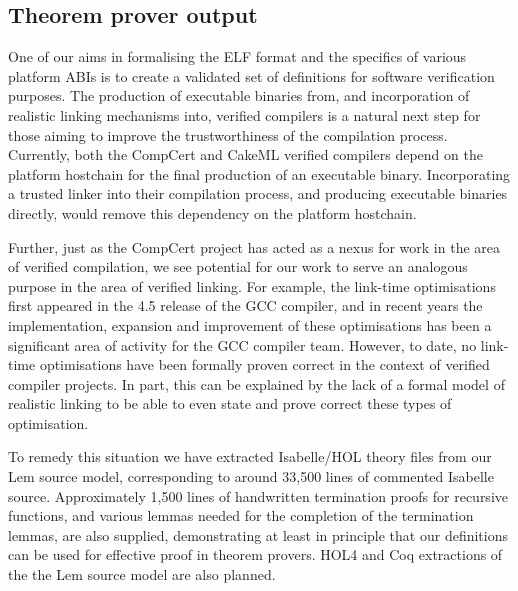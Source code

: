 \subsection{Theorem prover output}
\label{subsect.theorem.prover.output}

One of our aims in formalising the ELF format and the specifics of various platform ABIs is to create a validated set of definitions for software verification purposes.
The production of executable binaries from, and incorporation of realistic linking mechanisms into, verified compilers is a natural next step for those aiming to improve the trustworthiness of the compilation process.
Currently, both the CompCert and CakeML verified compilers depend on the platform hostchain for the final production of an executable binary.
Incorporating a trusted linker into their compilation process, and producing executable binaries directly, would remove this dependency on the platform hostchain.

Further, just as the CompCert project has acted as a nexus for work in the area of verified compilation, we see potential for our work to serve an analogous purpose in the area of verified linking.
For example, the link-time optimisations first appeared in the 4.5 release of the GCC compiler, and in recent years the implementation, expansion and improvement of these optimisations has been a significant area of activity for the GCC compiler team.
However, to date, no link-time optimisations have been formally proven correct in the context of verified compiler projects.
In part, this can be explained by the lack of a formal model of realistic linking to be able to even state and prove correct these types of optimisation.

To remedy this situation we have extracted Isabelle/HOL theory files from our Lem source model, corresponding to around 33,500 lines of commented Isabelle source.
Approximately 1,500 lines of handwritten termination proofs for recursive functions, and various lemmas needed for the completion of the termination lemmas, are also supplied, demonstrating at least in principle that our definitions can be used for effective proof in theorem provers.
HOL4 and Coq extractions of the the Lem source model are also planned.
